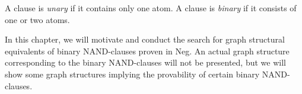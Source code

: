 \begin{definition}
  A clause is \textit{unary} if it contains only one atom.
  A clause is \textit{binary} if it consists of one or two atoms.
\end{definition}
In this chapter, we will motivate and conduct the search for graph structural equivalents of binary NAND-clauses proven in Neg.
An actual graph structure corresponding to the binary NAND-clauses will not be presented, but we will show some graph structures implying the provability of certain binary NAND-clauses.
